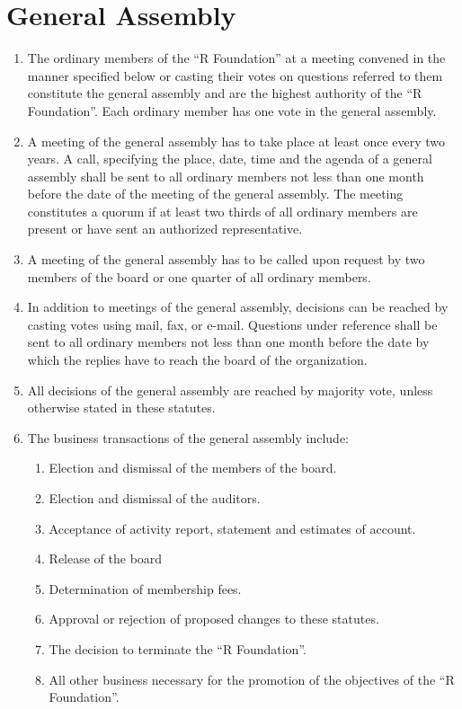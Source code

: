 \documentclass[a4paper]{article}
\newcommand{\RF}{``R Foundation''}
\begin{document}
\section{General Assembly}

\begin{enumerate}
 \item The ordinary members of the \RF{} at a meeting convened in the
  manner specified below or casting their votes on questions referred
  to them constitute the general assembly and are the highest
  authority of the \RF{}. Each ordinary member has one vote in the
  general assembly.
  
 \item A meeting of the general assembly has to take place at least
  once every two years. A call, specifying the place, date, time and
  the agenda of a general assembly shall be sent to all ordinary
  members not less than one month before the date of the meeting of
  the general assembly. The meeting constitutes a quorum if at least
  two thirds of all ordinary members are present or have sent an
  authorized representative.
  
 \item A meeting of the general assembly has to be called upon request
  by two members of the board or one quarter of all ordinary members. 
  
 \item In addition to meetings of the general assembly, decisions can
  be reached by casting votes using mail, fax, or e-mail. Questions
  under reference shall be sent to all ordinary members not less than
  one month before the date by which the replies have to reach the
  board of the organization.
  
 \item All decisions of the general assembly are reached by majority
  vote, unless otherwise stated in these statutes.
  
 \item The business transactions of the general assembly include:
  \begin{enumerate}
   \item Election and dismissal of the members of the board.
   \item Election and dismissal of the auditors.
   \item Acceptance of activity report, statement and estimates of
    account.
   \item Release of the board
   \item Determination of membership fees.
   \item Approval or rejection of proposed changes to these statutes.
   \item The decision to terminate the \RF{}.
   \item All other business necessary for the promotion of the
    objectives of the \RF{}.
  \end{enumerate}
\end{enumerate}
\end{document}
